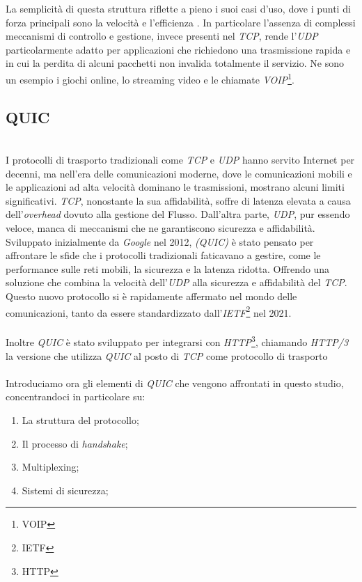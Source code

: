 \noindent La semplicità di questa struttura riflette a pieno i suoi casi d'uso, dove i punti di forza principali sono la velocità e l'efficienza \cite{site:udp}.
In particolare l'assenza di complessi meccanismi di controllo e gestione, invece presenti nel \emph{TCP}, rende l'\emph{UDP} particolarmente adatto per applicazioni che richiedono una trasmissione rapida e in cui la perdita di alcuni pacchetti non invalida totalmente il servizio.
Ne sono un esempio i giochi online, lo streaming video e le chiamate \emph{VOIP}\footnote{\gls{VOIP}}.

\subsection{QUIC}
~\\
\indent I protocolli di trasporto tradizionali come \emph{TCP} e \emph{UDP} hanno servito Internet per decenni, ma nell'era delle comunicazioni moderne, dove le comunicazioni mobili e le applicazioni ad alta velocità dominano le trasmissioni, mostrano alcuni limiti significativi.
\emph{TCP}, nonostante la sua affidabilità, soffre di latenza elevata a causa dell'\emph{overhead} dovuto alla gestione del Flusso. 
Dall'altra parte, \emph{UDP}, pur essendo veloce, manca di meccanismi che ne garantiscono sicurezza e affidabilità.
\\
Sviluppato inizialmente da \emph{Google} nel 2012, \emph{ (\gls*{QUIC})} è stato pensato per affrontare le sfide che i protocolli tradizionali faticavano a gestire, come le performance sulle reti mobili, la sicurezza e la latenza ridotta.
Offrendo una soluzione che combina la velocità dell'\emph{UDP} alla sicurezza e affidabilità del \emph{TCP}. Questo nuovo protocollo si è rapidamente affermato nel mondo delle comunicazioni, tanto da essere standardizzato dall'\emph{IETF}\footnote{\gls{IETF}} nel 2021.
\\\\
Inoltre \emph{QUIC} è stato sviluppato per integrarsi con \emph{HTTP}\footnote{\gls{HTTP}}, chiamando \emph{HTTP/3} la versione che utilizza \emph{QUIC} al posto di
\emph{TCP} come protocollo di trasporto \cite{site:HTTP-over-QUIC} \\\\
\noindent Introduciamo ora gli elementi di \emph{QUIC} che vengono affrontati in questo studio, concentrandoci in particolare su:
\begin{enumerate}
    \item La struttura del protocollo;
    \item Il processo di \emph{handshake};
    \item Multiplexing;
    \item Sistemi di sicurezza;
\end{enumerate}

